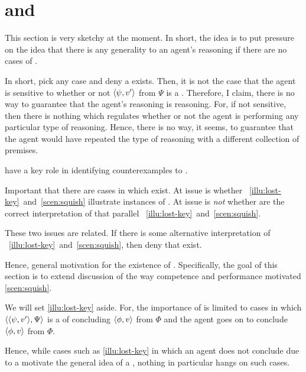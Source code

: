 \section{ and }
\label{cha:requs:sec:add-illu}

{
  \color{red}
  This section is very sketchy at the moment.
  In short, the idea is to put pressure on the idea that there is any generality to an agent's reasoning if there are no cases of .

  In short, pick any case and deny a \requ{} exists.
  Then, it is not the case that the agent is sensitive to whether or not \(\langle \psi, v' \rangle\) from \(\Psi\) is a \fc{}.
  Therefore, I claim, there is no way to guarantee that the agent's reasoning is \sR{} reasoning.
  For, if not sensitive, then there is nothing which regulates whether or not the agent is performing any particular type of reasoning.
  Hence, there is no way, it seems, to guarantee that the agent would have repeated the type of reasoning with a different collection of premises.
}

\begin{note}
   have a key role in identifying counterexamples to \issueConstraint{}.

  Important that there are cases in which  exist.
  At issue is whether ~\ref{illu:lost-key}~and~\ref{scen:squish} illustrate instances of .
  At issue is \emph{not} whether  are the correct interpretation of  that parallel ~\ref{illu:lost-key}~and~\ref{scen:squish}.

  These two issues are related.
  If there is some alternative interpretation of ~\ref{illu:lost-key}~and~\ref{scen:squish}, then deny that  exist.

  Hence, general motivation for the existence of \requ{}.
  Specifically, the goal of this section is to extend discussion of the way competence and performance motivated \autoref{scen:squish}.

  We will set \autoref{illu:lost-key} aside.
  For, the importance of  is limited to cases in which \(\langle \langle \psi, v' \rangle, \Psi \rangle\) is a  of concluding \(\langle \phi, v \rangle\) from \(\Phi\) and the agent goes on to conclude \(\langle \phi, v \rangle\) from \(\Phi\).

  Hence, while cases such as \autoref{illu:lost-key} in which an agent does not conclude due to a \requ{} motivate the general idea of a \requ{}, nothing in particular hangs on such cases.
\end{note}

